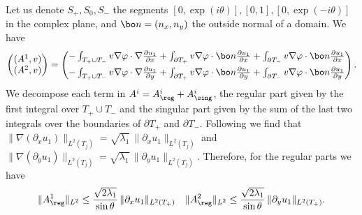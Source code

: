 Let us denote $S_+, S_0, S_-$ the segments $[0,\exp (i \theta)], [0,1], [0,\exp (-i \theta)]$ in the complex plane, and $\bo n=(n_x,n_y)$ the outside normal of a domain. We have
\[
\begin{pmatrix} (A^1,v)\\ (A^2,v) \end{pmatrix} = \begin{pmatrix} - \int_{T_+\cup T_-} v \nabla \varphi \cdot \nabla \frac{\partial u_1}{\partial x} + \int_{\partial T_+} v \nabla \varphi \cdot \bo n \frac{\partial u_1}{\partial x} +\int_{\partial T_-} v \nabla \varphi \cdot \bo n \frac{\partial u_1}{\partial x} \\[5pt] - \int_{T_+\cup T_-} v \nabla \varphi \cdot \nabla \frac{\partial u_1}{\partial y} + \int_{\partial T_+} v \nabla \varphi \cdot \bo n \frac{\partial u_1}{\partial y} +\int_{\partial T_-} v \nabla \varphi \cdot \bo n \frac{\partial u_1}{\partial y} \end{pmatrix}.
\]
We decompose each term in $A^i=A^i_{\reg}+A^i_{\sing}$, the regular part given by the first integral over $T_+\cup T_-$ and the singular part given by the sum of the last two integrals over the boundaries of $\partial T_+$ and $\partial T_-$. Following \cite[Lem.\,3.4.1.2-3]{grisvard} we find that $\|\nabla(\partial_x u_1)\|_{L^2(T_j)} = \sqrt{\lambda_1}\, \|\partial_x u_1\|_{L^2(T_j)}$ and $\|\nabla(\partial_y u_1)\|_{L^2(T_j)} = \sqrt{\lambda_1}\, \|\partial_y u_1\|_{L^2(T_j)}$. Therefore, for the regular parts we have
\[
\|A^1_{\reg}\|_{L^2} \leq \frac{\sqrt{2\lambda_1}}{\sin \theta}\, \|\partial_x u_1\|_{L^2(T_+)} \quad \|A^2_{\reg}\|_{L^2} \leq \frac{\sqrt{2\lambda_1}}{\sin \theta}\,\|\partial_y u_1\|_{L^2(T_+)}.
\]

